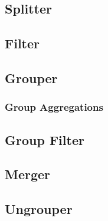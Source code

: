 \subsection{Splitter}
\subsection{Filter}
\subsection{Grouper}
\subsubsection{Group Aggregations}
\subsection{Group Filter}
\subsection{Merger}
\subsection{Ungrouper}
